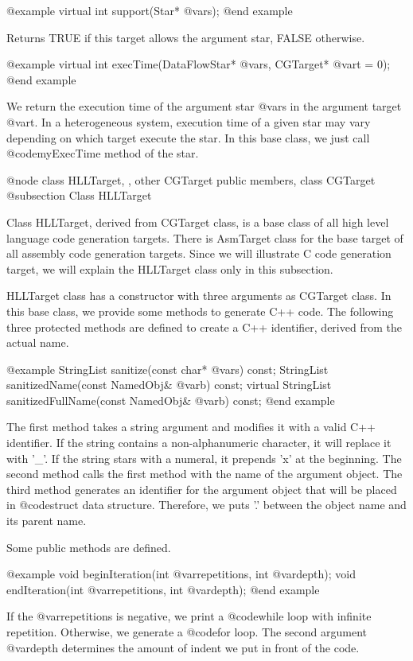 @example
virtual int support(Star* @var{s});
@end example

Returns TRUE if this target allows the argument star, FALSE otherwise.

@example
virtual int execTime(DataFlowStar* @var{s}, CGTarget* @var{t} = 0);
@end example

We return the execution time of the argument star @var{s} in the argument
target @var{t}. In a heterogeneous system, execution time of a given
star may vary depending on which target execute the star. In this base
class, we just call @code{myExecTime} method of the star.

@node class HLLTarget, , other CGTarget public members, class CGTarget
@subsection Class HLLTarget

Class HLLTarget, derived from CGTarget class, is a base class of
all high level language code generation targets. There is
AsmTarget class for the base target of all assembly code generation
targets. Since we will illustrate C code generation target, we will
explain the HLLTarget class only in this subsection.

HLLTarget class has a constructor with three arguments as CGTarget class.
In this base class, we provide some methods to generate C++ code.
The following three protected methods are defined to create a
C++ identifier, derived from the actual name.

@example
StringList sanitize(const char* @var{s}) const;
StringList sanitizedName(const NamedObj& @var{b}) const;
virtual StringList sanitizedFullName(const NamedObj& @var{b}) const;
@end example

The first method takes a string argument and modifies it with a valid
C++ identifier. If the string contains a non-alphanumeric character, it
will replace it with '_'. If the string stars with a numeral, it
prepends 'x' at the beginning. The second method calls the first method
with the name of the argument object. The third method generates
an identifier for the argument object that will be placed in @code{struct}
data structure. Therefore, we puts '.' between the object name and its
parent name.

Some public methods are defined.

@example
void beginIteration(int @var{repetitions}, int @var{depth});
void endIteration(int @var{repetitions}, int @var{depth});
@end example

If the @var{repetitions} is negative, we print a @code{while} loop
with infinite repetition. Otherwise, we generate a @code{for}
loop. The second argument @var{depth} determines the amount of indent
we put in front of the code.

